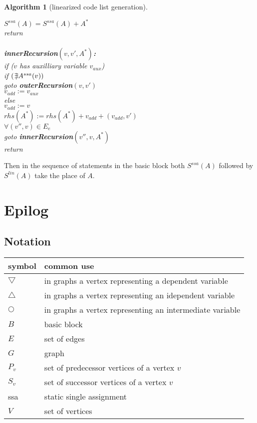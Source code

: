 \documentclass{book}
\newcommand{\notexists}{{ \kern .2em | \kern -.4em \exists }}
\newtheorem{Alg}{Algorithm}
\begin{document}
\begin{Alg}[linearized code list generation]
\begin{tabbing}
\>\> $S^{ssa}(A)=S^{ssa}(A)+A^*$ \\
\> return \\
\\
{\bf innerRecursion$(v,v',A^*)$:}\\
\> if ($v$ has auxilliary variable $v_{aux}$) \\
\>\> if $(\notexists A^{ssa}(v))$\\
\>\>\> goto {\bf outerRecursion}$(v,v')$ \\
\>\> $v_{add}:=v_{aux}$\\
\> else \\
\>\> $v_{add}:=v$\\
\> $rhs(A^*):=rhs(A^*)+v_{add} + (v_{add},v')$\\  
\>\> $\forall (v'',v)\in E_e$ \\
\>\>\> goto {\bf innerRecursion}$(v'',v,A^*)$ \\ 
\> return \\
\end{tabbing}
\end{Alg}

Then in the sequence of statements in the basic block both
$S^{ssa}(A)$ followed by $S^{lin}(A)$ take the place of $A$.

\chapter*{Epilog}
\section{Notation}
\begin{tabular}{|l|l|}\hline
symbol & common use \\\hline
$\bigtriangledown$ & in graphs a vertex representing a dependent variable \\
$\bigtriangleup$ & in graphs a vertex representing an idependent variable \\
$\bigcirc$ & in graphs a vertex representing an intermediate variable \\
$B$ & basic block \\
$E$ & set of edges \\
$G$ & graph \\
$P_v$ & set of predecessor vertices of a vertex $v$ \\
$S_v$ & set of successor vertices of a vertex $v$ \\
ssa & static single assignment \\
$V$ & set of vertices \\\hline
\end{tabular}




\printindex
\end{document}

